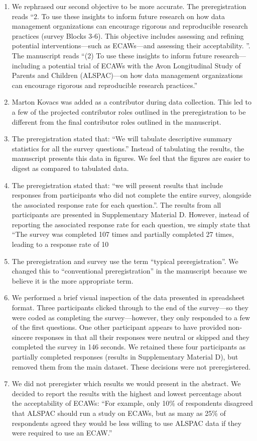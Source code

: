 \documentclass[
  man,floatsintext]{apa6}
\begin{document}
\begin{enumerate}

  \item We rephrased our second objective to be more accurate. The preregistration reads “2.    To use these insights to inform future research on how data management organizations can encourage rigorous and reproducible research practices (survey Blocks 3-6). This objective includes assessing and refining potential interventions—such as ECAWs—and assessing their acceptability. ”. The manuscript reads “(2) To use these insights to inform future research—including a potential trial of ECAWs with the Avon Longitudinal Study of Parents and Children (ALSPAC)—on how data management organizations can encourage rigorous and reproducible research practices.”
  \item Marton Kovacs was added as a contributor during data collection. This led to a few of the projected contributor roles outlined in the preregistration to be different from the final contributor roles outlined in the manuscript.
  \item The preregistration stated that: “We will tabulate descriptive summary statistics for all the survey questions.” Instead of tabulating the results, the manuscript presents this data in figures. We feel that the figures are easier to digest as compared to tabulated data.
  \item The preregistration stated that: “we   will   present   results   that   include   responses   from participants who did not complete the entire survey, alongside the associated response rate for each question.”. The results from all participants are presented in Supplementary Material D. However, instead of reporting the associated response rate for each question, we simply state that “The survey was completed 107 times and partially completed 27 times, leading to a response rate of 10%
  \item The preregistration and survey use the term “typical preregistration”. We changed this to “conventional preregistration” in the manuscript because we believe it is the more appropriate term.
  \item We performed a brief visual inspection of the data presented in spreadsheet format. Three participants clicked through to the end of the survey—so they were coded as completing the survey—however, they only responded to a few of the first questions. One other participant appears to have provided non-sincere responses in that all their responses were neutral or skipped and they completed the survey in 146 seconds. We retained these four participants as partially completed responses (results in Supplementary Material D), but removed them from the main dataset. These decisions were not preregistered.
  \item We did not preregister which results we would present in the abstract. We decided to report the results with the highest and lowest percentage about the acceptability of ECAWs: “For example, only 10\% of respondents disagreed that ALSPAC should run a study on ECAWs, but as many as 25\% of respondents agreed they would be less willing to use ALSPAC data if they were required to use an ECAW.”


\end{enumerate}
\end{document}
